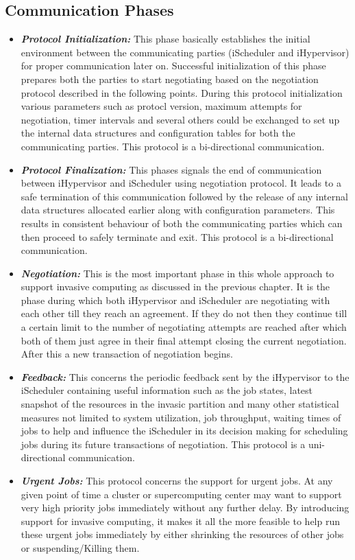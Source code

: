 \documentclass[a4paper, 12pt]{article}
\begin{document}
\subsection{Communication Phases}
\begin{itemize}
\item \textbf{\textit{Protocol Initialization:}} This phase basically establishes the initial environment between the communicating parties (iScheduler and iHypervisor) for proper communication later on. Successful initialization of this phase prepares both the parties to start negotiating based on the negotiation protocol described in the following points. During this protocol initialization various parameters such as protocl version, maximum attempts for negotiation, timer intervals and several others could be exchanged to set up the internal data structures and configuration tables for both the communicating parties. This protocol is a bi-directional communication.
\item \textbf{\textit{Protocol Finalization:}} This phases signals the end of communication between iHypervisor and iScheduler using negotiation protocol. It leads to a safe termination of this communication followed by the release of any internal data structures allocated earlier along with configuration parameters. This results in consistent behaviour of both the communicating parties which can then proceed to safely terminate and exit. This protocol is a bi-directional communication.
\item \textbf{\textit{Negotiation:}} This is the most important phase in this whole approach to support invasive computing as discussed in the previous chapter. It is the phase during which both iHypervisor and iScheduler are negotiating with each other till they reach an agreement. If they do not then they continue till a certain limit to the number of negotiating attempts are reached after which both of them just agree in their final attempt closing the current negotiation. After this a new transaction of negotiation begins.
\item \textbf{\textit{Feedback:}} This concerns the periodic feedback sent by the iHypervisor to the iScheduler containing useful information such as the job states, latest snapshot of the resources in the invasic partition and many other statistical measures not limited to system utilization, job throughput, waiting times of jobs to help and influence the iScheduler in its decision making for scheduling jobs during its future transactions of negotiation. This protocol is a uni-directional communication.
\item \textbf{\textit{Urgent Jobs:}} This protocol concerns the support for urgent jobs. At any given point of time a cluster or supercomputing center may want to support very high priority jobs immediately without any further delay. By introducing support for invasive computing, it makes it all the more feasible to help run these urgent jobs immediately by either shrinking the resources of other jobs or suspending/Killing them.
\end{itemize}
\end{document}
